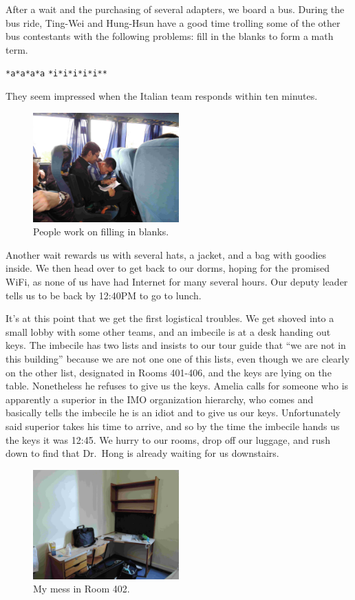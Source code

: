\documentclass[11pt]{scrreprt}
\numberwithin{figure}{chapter}
\begin{document}
After a wait and the purchasing of several adapters, we board a bus.
During the bus ride, Ting-Wei and Hung-Hsun have a good time trolling some of the other bus
contestants with the following problems: fill in the blanks to form a math term.
\begin{enumerate}
  \ii \verb+*a*a*a*a+
  \ii \verb+*i*i*i*i*i**+
\end{enumerate}
They seem impressed when the Italian team responds within ten minutes.

\begin{figure}[ht]
  \centering
  \includegraphics[width=0.5\textwidth]{media/bus_troll_problem.jpg}
  \caption{People work on filling in blanks.}
\end{figure}

Another wait rewards us with several hats, a jacket, and a bag with goodies inside.
We then head over to get back to our dorms, hoping for the promised WiFi, as none of us have had Internet
for many several hours. Our deputy leader tells us to be back by 12:40PM to go to lunch.

It's at this point that we get the first logistical troubles.
We get shoved into a small lobby with some other teams, and an imbecile is at a desk handing out keys.
The imbecile has two lists and insists to our tour guide that ``we are not in this building'' because we are
not one one of this lists, even though we are clearly on the other list, designated in Rooms 401-406, and
the keys are lying on the table. Nonetheless he refuses to give us the keys. Amelia calls for someone who
is apparently a superior in the IMO organization hierarchy, who comes and basically tells the imbecile he is an
idiot and to give us our keys. Unfortunately said superior takes his time to arrive, and so by the time the
imbecile hands us the keys it was 12:45. We hurry to our rooms, drop off our luggage, and rush down to find that
Dr.\ Hong is already waiting for us downstairs.

\begin{figure}[ht]
  \centering
  \includegraphics[width=0.5\textwidth]{media/room.jpg}
  \caption{My mess in Room 402.}
\end{figure}
\end{document}
